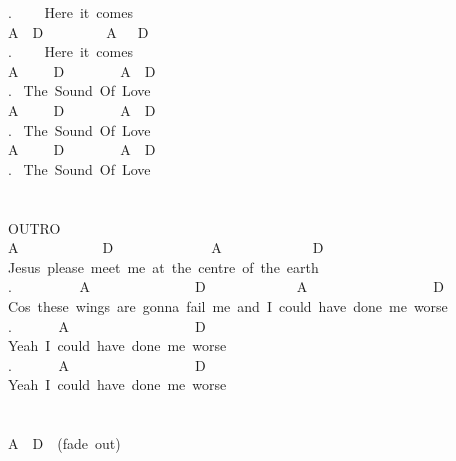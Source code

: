 {. \ \ \ \ Here\ it\ comes\\
A\ \ D\ \ \ \ \ \ \ \ \ A\ \ \ D\ \ \\
. \ \ \ \ Here\ it\ comes\\
A\ \ \ \ \ D\ \ \ \ \ \ \ \ A\ \ D\ \ \\
. \ The\ Sound\ Of\ Love\\
A\ \ \ \ \ D\ \ \ \ \ \ \ \ A\ \ D\ \ \\
. \ The\ Sound\ Of\ Love\\
A\ \ \ \ \ D\ \ \ \ \ \ \ \ A\ \ D\ \ \\
. \ The\ Sound\ Of\ Love\\
\\
\\
OUTRO\\
A\ \ \ \ \ \ \ \ \ \ \ \ D\ \ \ \ \ \ \ \ \ \ \ \ \ \ A\ \ \ \ \ \ \ \ \ \ \ \ \ D\\
Jesus\ please\ meet\ me\ at\ the\ centre\ of\ the\ earth\\
. \ \ \ \ \ \ \ \ \ A\ \ \ \ \ \ \ \ \ \ \ \ \ \ \ D\ \ \ \ \ \ \ \ \ \ \ \ \ A\ \ \ \ \ \ \ \ \ \ \ \ \ \ \ \ \ \ D\\
Cos\ these\ wings\ are\ gonna\ fail\ me\ and\ I\ could\ have\ done\ me\ worse\\
. \ \ \ \ \ \ A\ \ \ \ \ \ \ \ \ \ \ \ \ \ \ \ \ \ D\\
Yeah\ I\ could\ have\ done\ me\ worse\\
. \ \ \ \ \ \ A\ \ \ \ \ \ \ \ \ \ \ \ \ \ \ \ \ \ D\\
Yeah\ I\ could\ have\ done\ me\ worse\\
\\
\\
A\ \ D\ \ (fade\ out)\ }

